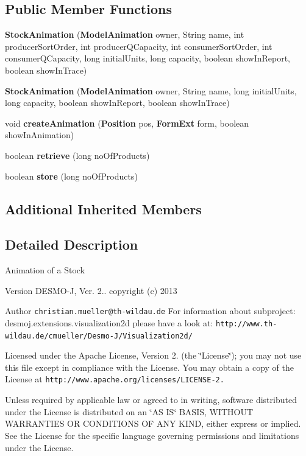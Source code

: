 \subsection*{Public Member Functions}
\begin{DoxyCompactItemize}
\item 
{\bf Stock\-Animation} ({\bf Model\-Animation} owner, String name, int producer\-Sort\-Order, int producer\-Q\-Capacity, int consumer\-Sort\-Order, int consumer\-Q\-Capacity, long initial\-Units, long capacity, boolean show\-In\-Report, boolean show\-In\-Trace)
\item 
{\bf Stock\-Animation} ({\bf Model\-Animation} owner, String name, long initial\-Units, long capacity, boolean show\-In\-Report, boolean show\-In\-Trace)
\item 
void {\bf create\-Animation} ({\bf Position} pos, {\bf Form\-Ext} form, boolean show\-In\-Animation)
\item 
boolean {\bf retrieve} (long no\-Of\-Products)
\item 
boolean {\bf store} (long no\-Of\-Products)
\end{DoxyCompactItemize}
\subsection*{Additional Inherited Members}


\subsection{Detailed Description}
Animation of a Stock

\begin{DoxyVersion}{Version}
D\-E\-S\-M\-O-\/\-J, Ver. 2.. copyright (c) 2013 
\end{DoxyVersion}
\begin{DoxyAuthor}{Author}
{\tt christian.\-mueller@th-\/wildau.\-de} For information about subproject\-: desmoj.\-extensions.\-visualization2d please have a look at\-: {\tt http\-://www.\-th-\/wildau.\-de/cmueller/\-Desmo-\/\-J/\-Visualization2d/}
\end{DoxyAuthor}
Licensed under the Apache License, Version 2. (the \char`\"{}\-License\char`\"{}); you may not use this file except in compliance with the License. You may obtain a copy of the License at {\tt http\-://www.\-apache.\-org/licenses/\-L\-I\-C\-E\-N\-S\-E-\/2.}

Unless required by applicable law or agreed to in writing, software distributed under the License is distributed on an \char`\"{}\-A\-S I\-S\char`\"{} B\-A\-S\-I\-S, W\-I\-T\-H\-O\-U\-T W\-A\-R\-R\-A\-N\-T\-I\-E\-S O\-R C\-O\-N\-D\-I\-T\-I\-O\-N\-S O\-F A\-N\-Y K\-I\-N\-D, either express or implied. See the License for the specific language governing permissions and limitations under the License. 

